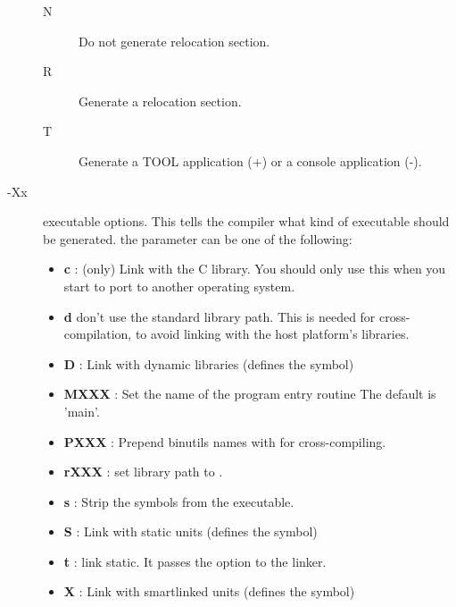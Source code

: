 \begin{description}
\begin{description}
\item[N] Do not generate relocation section.
\item[R] Generate a relocation section.
\item[T] Generate a TOOL application (+) or a console application (-).
\end{description}
\item [-Xx]  executable options. This tells the compiler what
kind of executable should be generated. the parameter 
can be one of the following:
\begin{itemize}
\item \textbf{c} : (\linux only) Link with the C library. You should only use this when
  you start to port \fpc to another operating system. 
\item \textbf{d} don't use the standard library path. This is needed for
cross-compilation, to avoid linking with the host platform's libraries.
\item \textbf{D} : Link with dynamic libraries (defines the
 symbol) 
\item \textbf{MXXX} : Set the name of the program entry routine 
The default is 'main'.
\item \textbf{PXXX} : Prepend binutils names with   for cross-compiling.
\item \textbf{rXXX} : set library path to .
\item \textbf{s} : Strip the symbols from the executable. 
\item \textbf{S} : Link with static units (defines the  symbol)
\item \textbf{t} : link static. It passes the  option to the
linker. 
\item \textbf{X} : Link with smartlinked units (defines the
 symbol) 
\end{itemize}
\end{description}

%
%


